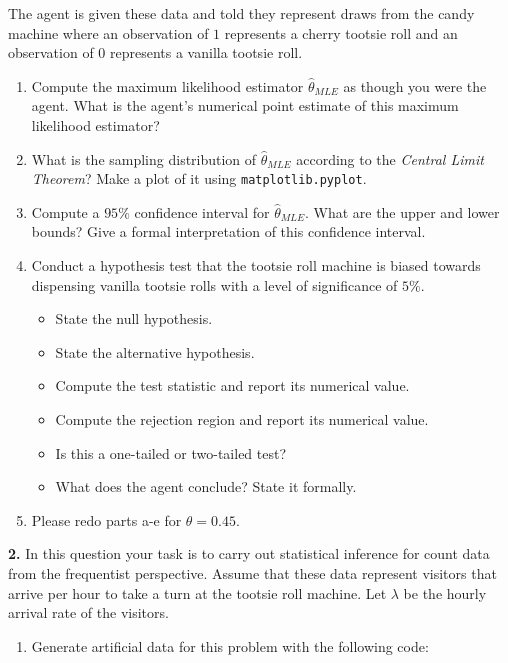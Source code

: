 \documentclass[
  letterpaper,
  DIV=11,
  numbers=noendperiod]{scrreprt}
\providecommand{\tightlist}{%
  \setlength{\itemsep}{0pt}\setlength{\parskip}{0pt}}\usepackage{longtable,booktabs,array}
\begin{document}
The agent is given these data and told they represent draws from the
candy machine where an observation of \(1\) represents a cherry tootsie
roll and an observation of \(0\) represents a vanilla tootsie roll.

\begin{enumerate}
\def\labelenumi{\alph{enumi}.}
\setcounter{enumi}{1}
\item
  Compute the maximum likelihood estimator \(\hat{\theta}_{MLE}\) as
  though you were the agent. What is the agent's numerical point
  estimate of this maximum likelihood estimator?
\item
  What is the sampling distribution of \(\hat{\theta}_{MLE}\) according
  to the \emph{Central Limit Theorem}? Make a plot of it using
  \texttt{matplotlib.pyplot}.
\item
  Compute a \(95\%\) confidence interval for \(\hat{\theta}_{MLE}\).
  What are the upper and lower bounds? Give a formal interpretation of
  this confidence interval.
\item
  Conduct a hypothesis test that the tootsie roll machine is biased
  towards dispensing vanilla tootsie rolls with a level of significance
  of \(5\%\).

  \begin{itemize}
  \tightlist
  \item
    State the null hypothesis.
  \item
    State the alternative hypothesis.
  \item
    Compute the test statistic and report its numerical value.
  \item
    Compute the rejection region and report its numerical value.
  \item
    Is this a one-tailed or two-tailed test?
  \item
    What does the agent conclude? State it formally.
  \end{itemize}
\item
  Please redo parts a-e for \(\theta = 0.45\).
\end{enumerate}

\textbf{2.} In this question your task is to carry out statistical
inference for count data from the frequentist perspective. Assume that
these data represent visitors that arrive per hour to take a turn at the
tootsie roll machine. Let \(\lambda\) be the hourly arrival rate of the
visitors.

\begin{enumerate}
\def\labelenumi{\alph{enumi}.}
\tightlist
\item
  Generate artificial data for this problem with the following code:
\end{enumerate}
\end{document}
